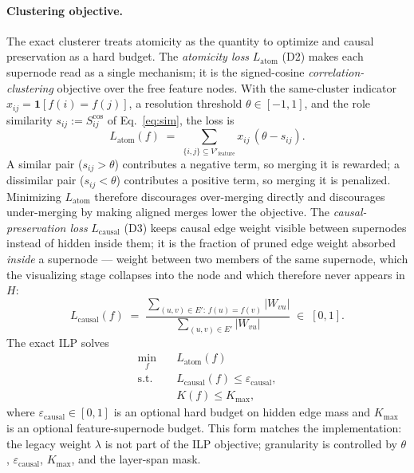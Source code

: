 \documentclass[../main.tex]{subfiles}
\begin{document}
\paragraph{Clustering objective.}
The exact clusterer treats atomicity as the quantity to optimize and causal
preservation as a hard budget. The \emph{atomicity loss} $L_{\text{atom}}$ (D2)
makes each supernode read as a single mechanism; it is the signed-cosine
\emph{correlation-clustering} objective over the free feature nodes. With the
same-cluster indicator $x_{ij} = \mathbf{1}[f(i) = f(j)]$, a resolution threshold
$\theta \in [-1, 1]$, and the role similarity $s_{ij} := S^{\cos}_{ij}$ of
Eq.~\eqref{eq:sim}, the loss is
\begin{equation}
L_{\text{atom}}(f)
\;=\;
\sum_{\{i, j\} \subseteq V'_{\text{feature}}} x_{ij}\,(\theta - s_{ij}).
\label{eq:Latom}
\end{equation}
A similar pair ($s_{ij} > \theta$) contributes a negative term, so merging it is
rewarded; a dissimilar pair ($s_{ij} < \theta$) contributes a positive term, so
merging it is penalized. Minimizing $L_{\text{atom}}$ therefore discourages
over-merging directly and discourages under-merging by making aligned merges lower
the objective. The \emph{causal-preservation loss} $L_{\text{causal}}$ (D3) keeps
causal edge weight visible between supernodes instead of hidden inside them; it is
the fraction of pruned edge weight absorbed \emph{inside} a supernode --- weight
between two members of the same supernode, which the visualizing stage collapses
into the node and which therefore never appears in $H$:
\begin{equation}
L_{\text{causal}}(f)
\;=\;
\frac{\sum_{(u, v) \in E':\, f(u) = f(v)} |W_{vu}|}
     {\sum_{(u, v) \in E'} |W_{vu}|}
\;\in\; [0, 1].
\label{eq:Lcausal}
\end{equation}
The exact ILP solves
\begin{equation}
\begin{aligned}
\min_f \quad & L_{\text{atom}}(f) \\
\text{s.t.}\quad & L_{\text{causal}}(f) \le \varepsilon_{\text{causal}}, \\
& K(f) \le K_{\max},
\end{aligned}
\label{eq:Lstage2}
\end{equation}
where $\varepsilon_{\text{causal}} \in [0, 1]$ is an optional hard budget on hidden
edge mass and $K_{\max}$ is an optional feature-supernode budget. This form matches
the implementation: the legacy weight $\lambda$ is not part of the ILP objective;
granularity is controlled by $\theta$, $\varepsilon_{\text{causal}}$, $K_{\max}$,
and the layer-span mask.
\end{document}
